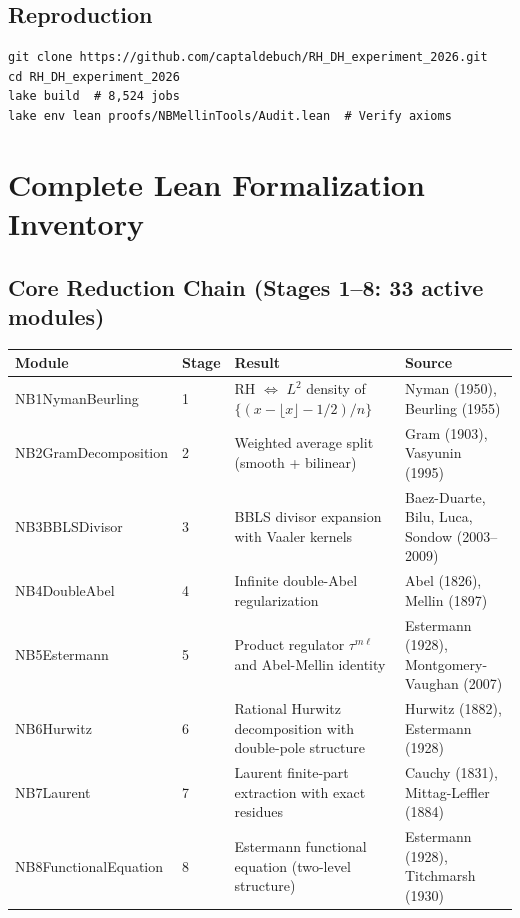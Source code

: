 \documentclass[11pt,a4paper]{article}
\theoremstyle{plain}
\theoremstyle{definition}
\theoremstyle{remark}
\begin{document}
\subsection{Reproduction}
\begin{verbatim}
git clone https://github.com/captaldebuch/RH_DH_experiment_2026.git
cd RH_DH_experiment_2026
lake build  # 8,524 jobs
lake env lean proofs/NBMellinTools/Audit.lean  # Verify axioms
\end{verbatim}

\section{Complete Lean Formalization Inventory}
\label{sec:lean-inventory}

\subsection{Core Reduction Chain (Stages 1--8: 33 active modules)}

\begin{longtable}{llp{4cm}l}
\textbf{Module} & \textbf{Stage} & \textbf{Result} & \textbf{Source} \\
\endhead
NB1NymanBeurling & 1 & RH $\Leftrightarrow$ $L^2$ density of $\{(x-\lfloor x\rfloor -1/2)/n\}$ & Nyman (1950), Beurling (1955) \\
NB2GramDecomposition & 2 & Weighted average split (smooth + bilinear) & Gram (1903), Vasyunin (1995) \\
NB3BBLSDivisor & 3 & BBLS divisor expansion with Vaaler kernels & Baez-Duarte, Bilu, Luca, Sondow (2003--2009) \\
NB4DoubleAbel & 4 & Infinite double-Abel regularization & Abel (1826), Mellin (1897) \\
NB5Estermann & 5 & Product regulator $\tau^{m\ell}$ and Abel-Mellin identity & Estermann (1928), Montgomery-Vaughan (2007) \\
NB6Hurwitz & 6 & Rational Hurwitz decomposition with double-pole structure & Hurwitz (1882), Estermann (1928) \\
NB7Laurent & 7 & Laurent finite-part extraction with exact residues & Cauchy (1831), Mittag-Leffler (1884) \\
NB8FunctionalEquation & 8 & Estermann functional equation (two-level structure) & Estermann (1928), Titchmarsh (1930) \\
\end{longtable}
\end{document}
